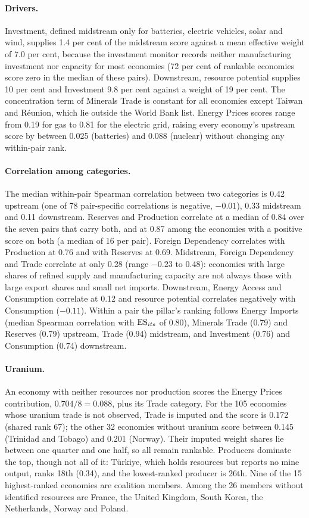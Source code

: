 \paragraph{Drivers.} Investment, defined midstream only for batteries, electric vehicles, solar and
wind, supplies 1.4 per cent of the midstream score against a mean effective weight of 7.0 per cent,
because the investment monitor records neither manufacturing investment nor capacity for most
economies (72 per cent of rankable economies score zero in the median of these pairs). Downstream,
resource potential supplies 10 per cent and Investment 9.8 per cent against a weight of 19 per
cent. The concentration term of Minerals Trade is constant for all economies except Taiwan and
R\'eunion, which lie outside the World Bank list. Energy Prices scores range from 0.19 for gas to
0.81 for the electric grid, raising every economy's upstream score by between 0.025 (batteries)
and 0.088 (nuclear) without changing any within-pair rank.

\paragraph{Correlation among categories.} The median within-pair Spearman correlation between two
categories is 0.42 upstream (one of 78 pair-specific correlations is negative, $-0.01$), 0.33
midstream and 0.11 downstream. Reserves and Production correlate at a median of 0.84 over the
seven pairs that carry both, and at 0.87 among the economies with a positive score on both (a
median of 16 per pair). Foreign Dependency correlates with Production at 0.76 and with Reserves at
0.69. Midstream, Foreign Dependency and Trade correlate at only 0.28 (range $-0.23$ to 0.48):
economies with large shares of refined supply and manufacturing capacity are not always those with
large export shares and small net imports. Downstream, Energy Access and Consumption correlate at
0.12 and resource potential correlates negatively with Consumption ($-0.11$). Within a pair the
pillar's ranking follows Energy Imports (median Spearman correlation with $\mathrm{ES}_{its}$ of 0.80),
Minerals Trade (0.79) and Reserves (0.79) upstream, Trade (0.94) midstream, and Investment (0.76)
and Consumption (0.74) downstream.

\paragraph{Uranium.} An economy with neither resources nor production scores the Energy Prices
contribution, $0.704/8=0.088$, plus its Trade category. For the 105 economies whose uranium trade is
not observed, Trade is imputed and the score is 0.172 (shared rank 67); the other 32 economies
without uranium score between 0.145 (Trinidad and Tobago) and 0.201 (Norway). Their imputed weight
shares lie between one quarter and one half, so all remain rankable. Producers dominate the top,
though not all of it: T\"urkiye, which holds resources but reports no mine output, ranks 18th
(0.34), and the lowest-ranked producer is 26th. Nine of the 15 highest-ranked economies are
coalition members. Among the 26 members without identified resources are France, the United
Kingdom, South Korea, the Netherlands, Norway and Poland.

